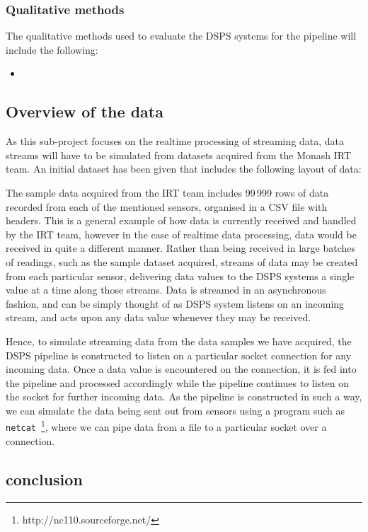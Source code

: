 

\subsubsection{Qualitative methods} %
\label{ssub:qualitative_methods}

The qualitative methods used to evaluate the DSPS systems for the pipeline will include the following:

\begin{itemize}
  \item
\end{itemize}





\subsection{Overview of the data} %
\label{sub:overview_of_the_data}

As this sub-project focuses on the realtime processing of streaming data, data streams will have to be simulated from
datasets acquired from the Monash IRT team. An initial dataset has been given that includes the following layout of data:


The sample data acquired from the IRT team includes 99\,999 rows of data recorded from each of the mentioned sensors,
organised in a CSV file with headers. This is a general example of how data is currently received and handled by the IRT
team, however in the case of realtime data processing, data would be received in quite a different manner. Rather than
being received in large batches of readings, such as the sample dataset acquired, streams of data may be created from
each particular sensor, delivering data values to the DSPS systems a single value at a time along those streams. Data
is streamed in an asynchronous fashion, and can be simply thought of as DSPS system listens on an incoming stream, and
acts upon any data value whenever they may be received.

Hence, to simulate streaming data from the data samples we have acquired, the DSPS pipeline is constructed to listen on
a particular socket connection for any incoming data. Once a data value is encountered on the connection, it is fed into
the pipeline and processed accordingly while the pipeline continues to listen on the socket for further incoming data.
As the pipeline is constructed in such a way, we can simulate the data being sent out from sensors using a program such
as \texttt{netcat}~\footnote{http://nc110.sourceforge.net/}, where we can pipe data from a file to a particular
socket over a connection.


\subsection{conclusion} %
\label{sub:conclusion}

